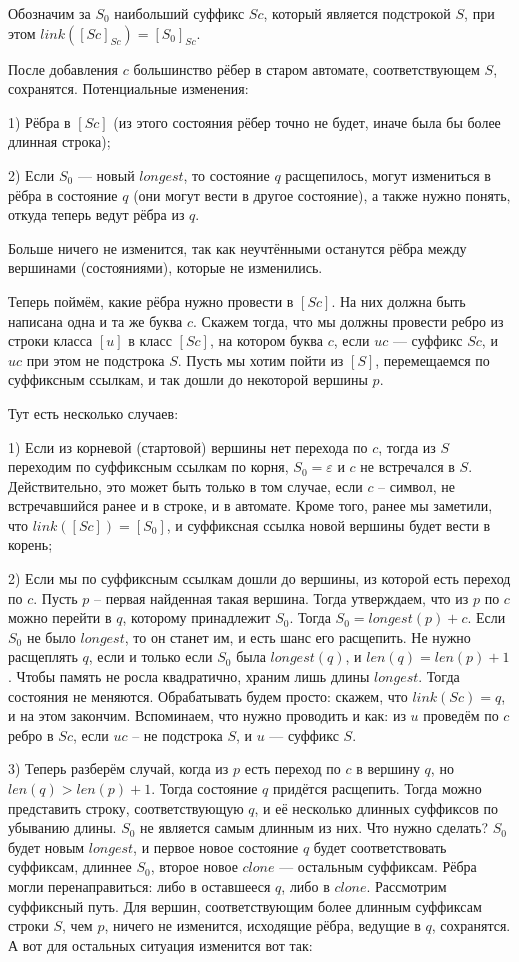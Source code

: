 Обозначим за $S_0$ наибольший суффикс $Sc$, который является подстрокой $S$, при этом $link([Sc]_{Sc}) = [S_0]_{Sc}$.

После добавления $c$ большинство рёбер в старом автомате, соответствующем $S$, сохранятся. Потенциальные изменения: 

1) Рёбра в $[Sc]$ (из этого состояния рёбер точно не будет, иначе была бы более длинная строка);

2) Если $S_0$ — новый $longest$, то состояние $q$ расщепилось, могут измениться в рёбра в состояние $q$ (они могут вести в другое состояние), а также нужно понять, откуда теперь ведут рёбра из $q$.

Больше ничего не изменится, так как неучтёнными останутся рёбра между вершинами (состояниями), которые не изменились.

Теперь поймём, какие рёбра нужно провести в $[Sc]$. На них должна быть написана одна и та же буква $c$. Скажем тогда, что мы должны провести ребро из строки класса $[u]$ в класс $[Sc]$, на котором буква $c$, если $uc$ — суффикс $Sc$, и $uc$ при этом не подстрока $S$. Пусть мы хотим пойти из $[S]$, перемещаемся по суффиксным ссылкам, и так дошли до некоторой вершины $p$.

Тут есть несколько случаев:

1)  Если из корневой (стартовой) вершины нет перехода по $c$, тогда из $S$ переходим по суффиксным ссылкам по корня, $S_0 = \varepsilon$ и $c$ не встречался в $S$. Действительно, это может быть только в том случае, если $c$ -- символ, не встречавшийся ранее и в строке, и в автомате. Кроме того, ранее мы заметили, что $link([Sc]) = [S_0]$, и суффиксная ссылка новой вершины будет вести в корень;

2) Если мы по суффиксным ссылкам дошли до вершины, из которой есть переход по $c$. Пусть $p$ -- первая найденная такая вершина. Тогда утверждаем, что из $p$ по $c$ можно перейти в $q$, которому принадлежит $S_0$. Тогда $S_0 = longest(p) + c$. Если $S_0$ не было $longest$, то он станет им, и есть шанс его расщепить. Не нужно расщеплять $q$, если и только если $S_0$ была $longest (q)$, и $len(q) = len(p) + 1$. Чтобы память не росла квадратично, храним лишь длины $longest$. Тогда состояния не меняются. Обрабатывать будем просто: скажем, что $link(Sc) = q$, и на этом закончим. Вспоминаем, что нужно проводить и как: из $u$ проведём по $c$ ребро в $Sc$, если $uc$ -- не подстрока $S$, и $u$ — суффикс $S$.

3) Теперь разберём случай, когда из $p$ есть переход по $c$ в вершину $q$, но $len(q) > len(p) + 1$. Тогда состояние $q$ придётся расщепить. Тогда можно представить строку, соответствующую $q$, и её несколько длинных суффиксов по убыванию длины. $S_0$ не является самым длинным из них. Что нужно сделать? $S_0$ будет новым $longest$, и первое новое состояние $q$ будет соответствовать суффиксам, длиннее $S_0$, второе новое $clone$ — остальным суффиксам. Рёбра могли перенаправиться: либо в оставшееся $q$, либо в $clone$. Рассмотрим суффиксный путь. Для вершин, соответствующим более длинным суффиксам строки $S$, чем $p$, ничего не изменится, исходящие рёбра, ведущие в $q$, сохранятся. А вот для остальных ситуация изменится вот так:

